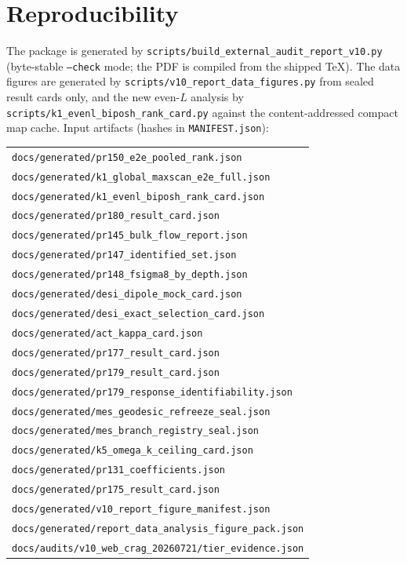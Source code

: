 \documentclass[10pt]{article}
\theoremstyle{definition}
\newcommand{\code}[1]{\texttt{\small #1}}
\begin{document}
\section{Reproducibility}
\label{sec:repro}

The package is generated by
\code{scripts/build\_external\_audit\_report\_v10.py} (byte-stable
\code{--check} mode; the PDF is compiled from the shipped TeX). The
data figures are generated by
\code{scripts/v10\_report\_data\_figures.py} from sealed result cards
only, and the new even-$L$ analysis by
\code{scripts/k1\_evenl\_biposh\_rank\_card.py} against the
content-addressed compact map cache. Input artifacts (hashes in
\code{MANIFEST.json}):

\begin{center}\scriptsize
\begin{tabular}{l}
\toprule
\code{docs/generated/pr150\_e2e\_pooled\_rank.json} \\
\code{docs/generated/k1\_global\_maxscan\_e2e\_full.json} \\
\code{docs/generated/k1\_evenl\_biposh\_rank\_card.json} \\
\code{docs/generated/pr180\_result\_card.json} \\
\code{docs/generated/pr145\_bulk\_flow\_report.json} \\
\code{docs/generated/pr147\_identified\_set.json} \\
\code{docs/generated/pr148\_fsigma8\_by\_depth.json} \\
\code{docs/generated/desi\_dipole\_mock\_card.json} \\
\code{docs/generated/desi\_exact\_selection\_card.json} \\
\code{docs/generated/act\_kappa\_card.json} \\
\code{docs/generated/pr177\_result\_card.json} \\
\code{docs/generated/pr179\_result\_card.json} \\
\code{docs/generated/pr179\_response\_identifiability.json} \\
\code{docs/generated/mes\_geodesic\_refreeze\_seal.json} \\
\code{docs/generated/mes\_branch\_registry\_seal.json} \\
\code{docs/generated/k5\_omega\_k\_ceiling\_card.json} \\
\code{docs/generated/pr131\_coefficients.json} \\
\code{docs/generated/pr175\_result\_card.json} \\
\code{docs/generated/v10\_report\_figure\_manifest.json} \\
\code{docs/generated/report\_data\_analysis\_figure\_pack.json} \\
\code{docs/audits/v10\_web\_crag\_20260721/tier\_evidence.json} \\
\bottomrule
\end{tabular}
\end{center}
\end{document}
